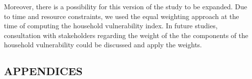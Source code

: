\documentclass[12pt, a4paper]{article}
\begin{document}
Moreover, there is a possibility for this version of the study to be expanded. Due to time and resource constraints, we used the equal weighting approach at the time of computing the household vulnerability index. In future studies, consultation with stakeholders regarding the weight of the the components of the household vulnerability could be discussed and apply the weights.

          
\clearpage

	

\setlength{\bibsep}{0pt}
\setlength{\bibhang}{4em}
\renewcommand{\bibname}{\centering\large\MakeUppercase{References}}

\renewcommand{\thepage}{\arabic{page}}
\clearpage

\begin{center}
\section*{APPENDICES}
\end{center}
\renewcommand{\thepage}{\arabic{page}}
\end{document}
